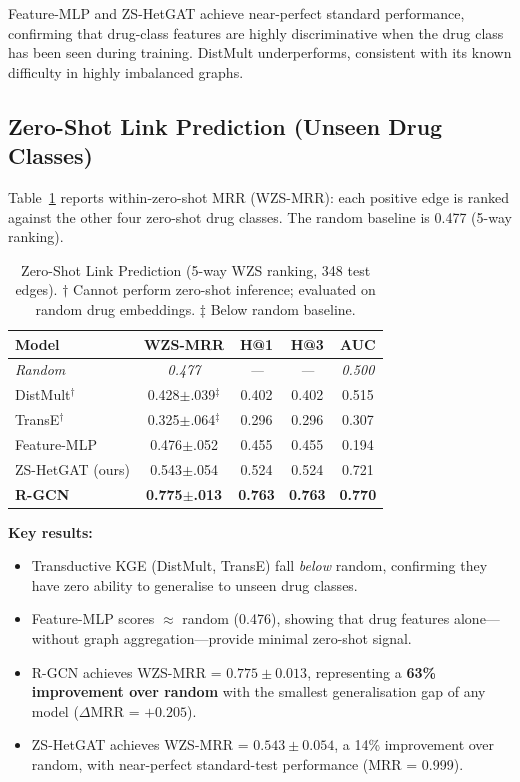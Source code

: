 \documentclass[conference]{IEEEtran}
\begin{document}
Feature-MLP and ZS-HetGAT achieve near-perfect standard performance,
confirming that drug-class features are highly discriminative when the
drug class has been seen during training. DistMult underperforms,
consistent with its known difficulty in highly imbalanced graphs.

\subsection{Zero-Shot Link Prediction (Unseen Drug Classes)}
Table~\ref{tab:zeroshot} reports within-zero-shot MRR (WZS-MRR):
each positive edge is ranked against the other four zero-shot drug
classes. The random baseline is 0.477 (5-way ranking).

\begin{table}[h]
\centering
\caption{Zero-Shot Link Prediction (5-way WZS ranking, 348 test edges).
$\dagger$ Cannot perform zero-shot inference; evaluated on random drug
embeddings. $\ddagger$ Below random baseline.}
\label{tab:zeroshot}
\begin{tabular}{lcccc}
\toprule
\textbf{Model} & \textbf{WZS-MRR} & \textbf{H@1} & \textbf{H@3} & \textbf{AUC} \\
\midrule
\textit{Random} & \textit{0.477} & \textit{—} & \textit{—} & \textit{0.500} \\
\midrule
DistMult$^\dagger$   & 0.428$\pm$.039$^\ddagger$ & 0.402 & 0.402 & 0.515 \\
TransE$^\dagger$     & 0.325$\pm$.064$^\ddagger$ & 0.296 & 0.296 & 0.307 \\
Feature-MLP          & 0.476$\pm$.052  & 0.455 & 0.455 & 0.194 \\
ZS-HetGAT (ours)     & 0.543$\pm$.054  & 0.524 & 0.524 & 0.721 \\
\textbf{R-GCN}       & \textbf{0.775}$\pm$\textbf{.013} & \textbf{0.763} & \textbf{0.763} & \textbf{0.770} \\
\bottomrule
\end{tabular}
\end{table}

\textbf{Key results:}
\begin{itemize}
  \item Transductive KGE (DistMult, TransE) fall \emph{below} random,
        confirming they have zero ability to generalise to unseen drug
        classes.
  \item Feature-MLP scores $\approx$ random (0.476), showing that
        drug features alone—without graph aggregation—provide minimal
        zero-shot signal.
  \item R-GCN achieves WZS-MRR = $0.775 \pm 0.013$, representing a
        \textbf{63\% improvement over random} with the smallest
        generalisation gap of any model ($\Delta$MRR = $+0.205$).
  \item ZS-HetGAT achieves WZS-MRR = $0.543 \pm 0.054$, a
        14\% improvement over random, with near-perfect standard-test
        performance (MRR = 0.999).
\end{itemize}
\end{document}

